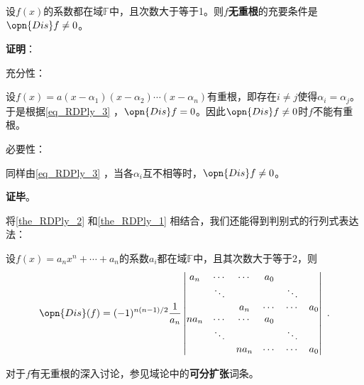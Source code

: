 \begin{theorem}{}\label{the_RDPly_1}
设$f(x)$的系数都在域$\mathbb{F}$中，且次数大于等于1。则$f$\textbf{无重根}的充要条件是$\opn{Dis}f\neq 0$。
\end{theorem}

\textbf{证明}：

充分性：

设$f(x)=a(x-\alpha_1)(x-\alpha_2)\cdots(x-\alpha_n)$有重根，即存在$i\neq j$使得$\alpha_i=\alpha_j$。于是根据\autoref{eq_RDPly_3} ，$\opn{Dis}f = 0$。因此$\opn{Dis}f\neq 0$时$f$不能有重根。

必要性：

同样由\autoref{eq_RDPly_3} ，当各$\alpha_i$互不相等时，$\opn{Dis}f\neq 0$。

\textbf{证毕}。


将\autoref{the_RDPly_2} 和\autoref{the_RDPly_1} 相结合，我们还能得到判别式的行列式表达法：

\begin{theorem}{}
设$f(x)=a_nx^n+\cdots+a_n$的系数$a_i$都在域$\mathbb{F}$中，且其次数大于等于2，则
\begin{equation}
\opn{Dis}(f) = (-1)^{n(n-1)/2}\frac{1}{a_n}
\begin{vmatrix}
a_n&\cdots&\cdots&a_0\\
&\ddots&&&\ddots\\
&&a_n&\cdots&\cdots&a_0\\
na_n&\cdots&\cdots&a_0\\
&\ddots&&&\ddots\\
&&na_n&\cdots&\cdots&a_0
\end{vmatrix}~.
\end{equation}
\end{theorem}

对于$f$有无重根的深入讨论，参见域论中的\textbf{可分扩张}词条。









